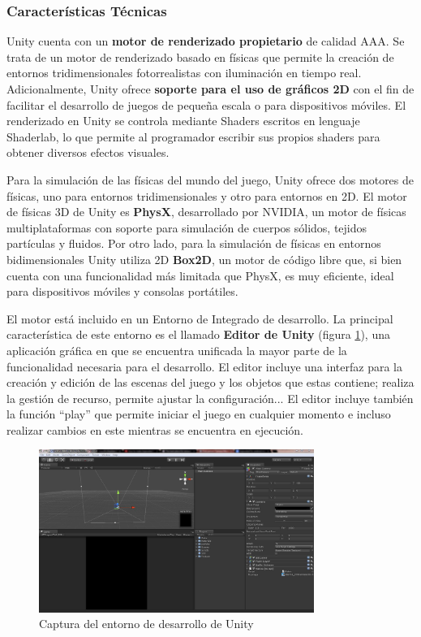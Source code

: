 \subsubsection{Características Técnicas}
Unity cuenta con un \textbf{motor de renderizado propietario} de calidad AAA. Se trata de un motor de renderizado basado en físicas que permite la creación de entornos tridimensionales fotorrealistas con iluminación en tiempo real. Adicionalmente, Unity ofrece \textbf{soporte para el uso de gráficos 2D} con el fin de facilitar el desarrollo de juegos de pequeña escala o para dispositivos móviles. El renderizado en Unity se controla mediante Shaders escritos en lenguaje Shaderlab, lo que permite al programador escribir sus propios shaders para obtener diversos efectos visuales. 

Para la simulación de las físicas del mundo del juego, Unity ofrece dos motores de físicas, uno para entornos tridimensionales y otro para entornos en 2D. El motor de físicas 3D de Unity es \textbf{PhysX}, desarrollado por NVIDIA, un motor de físicas multiplataformas con soporte para simulación de cuerpos sólidos, tejidos partículas y fluidos. Por otro lado, para la simulación de físicas en entornos bidimensionales Unity utiliza 2D \textbf{Box2D}, un motor de código libre que, si bien cuenta con una funcionalidad más limitada que PhysX, es muy eficiente, ideal para dispositivos móviles y consolas portátiles.

El motor está incluido en un Entorno de Integrado de desarrollo. La principal característica de este entorno es el llamado \textbf{Editor de Unity} (figura \ref{captura-unity}), una aplicación gráfica en que se encuentra unificada la mayor parte de la funcionalidad necesaria para el desarrollo. El editor incluye una interfaz para la creación y edición de las escenas del juego y los objetos que estas contiene; realiza la gestión de recurso, permite ajustar la configuración... El editor incluye también la función ``play'' que permite iniciar el juego en cualquier momento e incluso realizar cambios en este mientras se encuentra en ejecución.

\begin{figure}[h]
	\includegraphics[width=0.8\textwidth]{images/estadodelarte/motores/captura-unity}
	\centering
	\caption{Captura del entorno de desarrollo de Unity}
	\label{captura-unity}
\end{figure}

